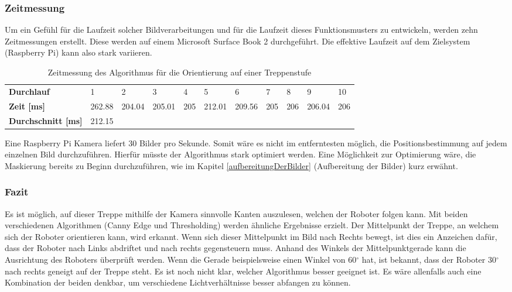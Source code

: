 \subsubsection{Zeitmessung}
Um ein Gefühl für die Laufzeit solcher Bildverarbeitungen und für die Laufzeit dieses Funktionsmusters zu entwickeln, werden zehn Zeitmessungen erstellt. Diese werden auf einem Microsoft Surface Book 2 durchgeführt. Die effektive Laufzeit auf dem Zielsystem (Raspberry Pi) kann also stark variieren.

\begin{center}
\begin{table}[H]
    \begin{tabular}{l|l|l|l|l|l|l|l|l|l|l}
        \textbf{Durchlauf} & 1 & 2 & 3 & 4 & 5 & 6 & 7 & 8 & 9 & 10 \\
        \textbf{Zeit [ms]} & 262.88 & 204.04 & 205.01 & 205 & 212.01 & 209.56 & 205 & 206 & 206.04 & 206 \\
        \textbf{Durchschnitt [ms]} & 212.15 \\
    \end{tabular}
    \caption{Zeitmessung des Algorithmus für die Orientierung auf einer Treppenstufe}
\end{table}
\end{center}

Eine Raspberry Pi Kamera liefert 30 Bilder pro Sekunde. Somit wäre es nicht im entferntesten möglich, die Positionsbestimmung auf jedem einzelnen Bild durchzuführen. Hierfür müsste der Algorithmus stark optimiert werden. Eine Möglichkeit zur Optimierung wäre, die Maskierung bereits zu Beginn durchzuführen, wie im Kapitel \ref{aufbereitungDerBilder} (Aufbereitung der Bilder) kurz erwähnt.
  
\subsubsection{Fazit}
Es ist möglich, auf dieser Treppe mithilfe der Kamera sinnvolle Kanten auszulesen, welchen der Roboter folgen kann. Mit beiden verschiedenen Algorithmen (Canny Edge und Thresholding) werden ähnliche Ergebnisse erzielt. Der Mittelpunkt der Treppe, an welchem sich der Roboter orientieren kann, wird erkannt. Wenn sich dieser Mittelpunkt im Bild nach Rechts bewegt, ist dies ein Anzeichen dafür, dass der Roboter nach Links abdriftet und nach rechts gegensteuern muss. Anhand des Winkels der Mittelpunktgerade kann die Ausrichtung des Roboters überprüft werden. Wenn die Gerade beispielsweise einen Winkel von 60$^\circ$
 hat, ist bekannt, dass der Roboter 30$^\circ$ nach rechts geneigt auf der Treppe steht.
Es ist noch nicht klar, welcher Algorithmus besser geeignet ist. Es wäre allenfalls auch eine Kombination der beiden denkbar, um verschiedene Lichtverhältnisse besser abfangen zu können.

